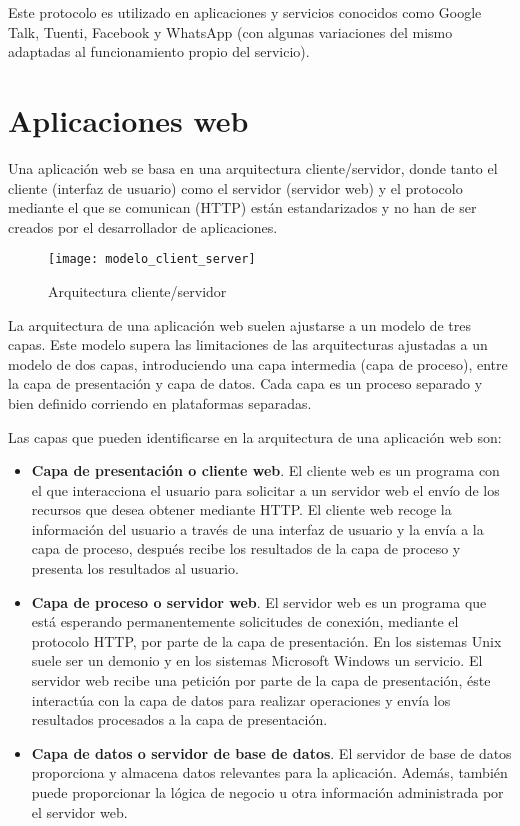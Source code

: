 Este protocolo es utilizado en aplicaciones y servicios conocidos como Google Talk, Tuenti, Facebook y WhatsApp (con algunas variaciones del mismo adaptadas al funcionamiento propio del servicio).

\section{Aplicaciones web}

Una aplicación web se basa en una arquitectura cliente/servidor, donde tanto el cliente (interfaz de usuario) como el servidor (servidor web) y el protocolo mediante el que se comunican (HTTP) están estandarizados y no han de ser creados por el desarrollador de aplicaciones.

\begin{figure}[htp!]
  \centering
  \texttt{[image: modelo\_client\_server]}
  \caption{Arquitectura cliente/servidor}
  \label{fig:modelo_client_server}
\end{figure}

La arquitectura de una aplicación web suelen ajustarse a un modelo de tres capas. Este modelo supera las limitaciones de las arquitecturas ajustadas a un modelo de dos capas, introduciendo una capa intermedia (capa de proceso), entre la capa de presentación y  capa de datos. Cada capa es un proceso separado y bien definido corriendo en plataformas separadas.

Las capas que pueden identificarse en la arquitectura de una aplicación web son:

\begin{itemize}
  \item \textbf{Capa de presentación o cliente web}. El cliente web es un programa con el que interacciona el usuario para solicitar a un servidor web el envío de los recursos que desea obtener mediante HTTP. El cliente web recoge la información del usuario a través de una interfaz de usuario y la envía a la capa de proceso, después recibe los resultados de la capa de proceso y presenta los resultados al usuario.
  \item \textbf{Capa de proceso o servidor web}. El servidor web es un programa que está esperando permanentemente solicitudes de conexión, mediante el protocolo HTTP, por parte de la capa de presentación. En los sistemas Unix suele ser un demonio y en los sistemas Microsoft Windows un servicio. El servidor web recibe una petición por parte de la capa de presentación, éste interactúa con la capa de datos para realizar operaciones y envía los resultados procesados a la capa de presentación.
  \item \textbf{Capa de datos o servidor de base de datos}. El servidor de base de datos proporciona y almacena datos relevantes para la aplicación. Además, también puede proporcionar la lógica de negocio u otra información administrada por el servidor web.
\end{itemize}

